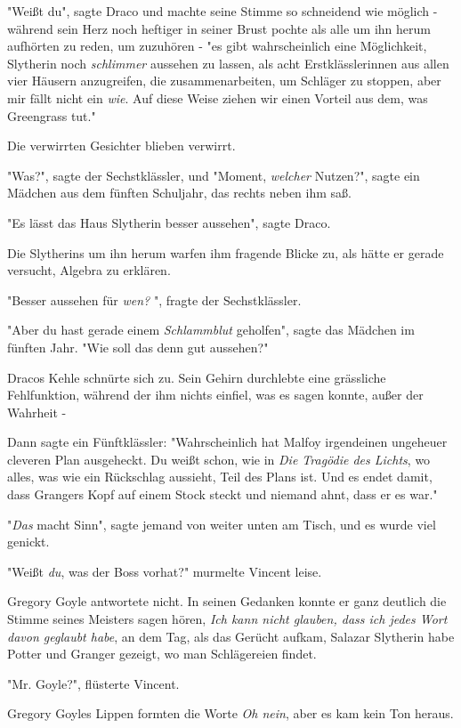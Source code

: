 {"Weißt du", sagte Draco und machte seine Stimme so schneidend wie möglich - während sein Herz noch heftiger in seiner Brust pochte als alle um ihn herum aufhörten zu reden, um zuzuhören - "es gibt wahrscheinlich eine Möglichkeit, Slytherin noch \emph{schlimmer} aussehen zu lassen, als acht Erstklässlerinnen aus allen vier Häusern anzugreifen, die zusammenarbeiten, um Schläger zu stoppen, aber mir fällt nicht ein \emph{wie}. Auf diese Weise ziehen wir einen Vorteil aus dem, was Greengrass tut."

Die verwirrten Gesichter blieben verwirrt.

"Was?", sagte der Sechstklässler, und "Moment, \emph{welcher} Nutzen?", sagte ein Mädchen aus dem fünften Schuljahr, das rechts neben ihm saß.

"Es lässt das Haus Slytherin besser aussehen", sagte Draco.

Die Slytherins um ihn herum warfen ihm fragende Blicke zu, als hätte er gerade versucht, Algebra zu erklären.

"Besser aussehen für \emph{wen?} ", fragte der Sechstklässler.

"Aber du hast gerade einem \emph{Schlammblut} geholfen", sagte das Mädchen im fünften Jahr. "Wie soll das denn gut aussehen?"

Dracos Kehle schnürte sich zu. Sein Gehirn durchlebte eine grässliche Fehlfunktion, während der ihm nichts einfiel, was es sagen konnte, außer der Wahrheit -

Dann sagte ein Fünftklässler: "Wahrscheinlich hat Malfoy irgendeinen ungeheuer cleveren Plan ausgeheckt. Du weißt schon, wie in \emph{Die Tragödie des Lichts}, wo alles, was wie ein Rückschlag aussieht, Teil des Plans ist. Und es endet damit, dass Grangers Kopf auf einem Stock steckt und niemand ahnt, dass er es war."

"\emph{Das} macht Sinn", sagte jemand von weiter unten am Tisch, und es wurde viel genickt.

"Weißt \emph{du}, was der Boss vorhat?" murmelte Vincent leise.

Gregory Goyle antwortete nicht. In seinen Gedanken konnte er ganz deutlich die Stimme seines Meisters sagen hören, \emph{Ich kann nicht glauben, dass ich jedes Wort davon geglaubt habe}, an dem Tag, als das Gerücht aufkam, Salazar Slytherin habe Potter und Granger gezeigt, wo man Schlägereien findet.

"Mr. Goyle?", flüsterte Vincent.

Gregory Goyles Lippen formten die Worte \emph{Oh nein}, aber es kam kein Ton heraus.

}
